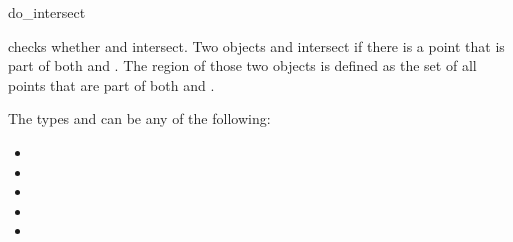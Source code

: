 \begin{ccRefFunction}{do_intersect}

 {checks
  whether  and  intersect.  Two objects
   and  intersect if there is a point
   that is part of both  and .
  The  region of those two objects is
  defined as the set of all points  that are part of both
   and .  }

The types  and  can be any of the following:
\begin{itemize}
\item {}
\item {}
\item {}
\item {}
\item {}
\end{itemize}

\ccSeeAlso {}

\end{ccRefFunction}
